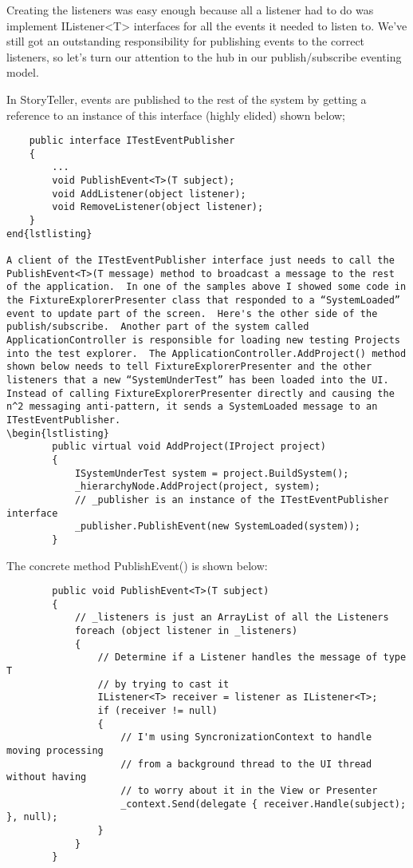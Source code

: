 \documentclass{article}
\begin{document}
{Creating the listeners was easy enough because all a listener had to do was implement IListener<T> interfaces for all the events it needed to listen to.  We've still got an outstanding responsibility for publishing events to the correct listeners, so let's turn our attention to the hub in our publish/subscribe eventing model.

In StoryTeller, events are published to the rest of the system by getting a reference to an instance of this interface (highly elided) shown below;
\begin{lstlisting}
    public interface ITestEventPublisher
    {
        ...
        void PublishEvent<T>(T subject);
        void AddListener(object listener);
        void RemoveListener(object listener);
    }
end{lstlisting}

A client of the ITestEventPublisher interface just needs to call the PublishEvent<T>(T message) method to broadcast a message to the rest of the application.  In one of the samples above I showed some code in the FixtureExplorerPresenter class that responded to a “SystemLoaded” event to update part of the screen.  Here's the other side of the publish/subscribe.  Another part of the system called ApplicationController is responsible for loading new testing Projects into the test explorer.  The ApplicationController.AddProject() method shown below needs to tell FixtureExplorerPresenter and the other listeners that a new “SystemUnderTest” has been loaded into the UI.  Instead of calling FixtureExplorerPresenter directly and causing the n^2 messaging anti-pattern, it sends a SystemLoaded message to an ITestEventPublisher.
\begin{lstlisting}
        public virtual void AddProject(IProject project)
        {
            ISystemUnderTest system = project.BuildSystem();
            _hierarchyNode.AddProject(project, system);
            // _publisher is an instance of the ITestEventPublisher interface
            _publisher.PublishEvent(new SystemLoaded(system));
        }
\end{lstlisting}
\newpage
The concrete method PublishEvent() is shown below: 
\begin{lstlisting}
        public void PublishEvent<T>(T subject)
        {
            // _listeners is just an ArrayList of all the Listeners 
            foreach (object listener in _listeners)
            {
                // Determine if a Listener handles the message of type T
                // by trying to cast it
                IListener<T> receiver = listener as IListener<T>;
                if (receiver != null)
                {
                    // I'm using SyncronizationContext to handle moving processing
                    // from a background thread to the UI thread without having 
                    // to worry about it in the View or Presenter
                    _context.Send(delegate { receiver.Handle(subject); }, null);
                }
            }
        }
\end{lstlisting}

}
\end{document}
